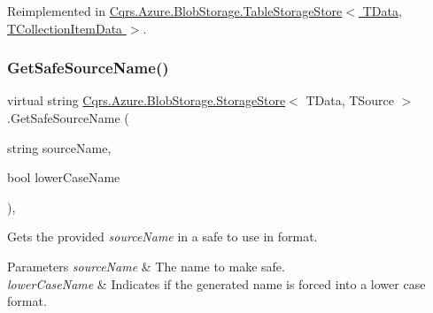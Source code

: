 Reimplemented in \hyperlink{classCqrs_1_1Azure_1_1BlobStorage_1_1TableStorageStore_a7b9e49aa8017ff3c55b184b956a150d0_a7b9e49aa8017ff3c55b184b956a150d0}{Cqrs.\+Azure.\+Blob\+Storage.\+Table\+Storage\+Store$<$ T\+Data, T\+Collection\+Item\+Data $>$}.

\mbox{\label{classCqrs_1_1Azure_1_1BlobStorage_1_1StorageStore_ad3364a0c84d5ed666615b9528d6f640e_ad3364a0c84d5ed666615b9528d6f640e}} 
\subsubsection{\texorpdfstring{Get\+Safe\+Source\+Name()}{GetSafeSourceName()}\hspace{0.1cm}{\footnotesize\ttfamily [2/2]}}
{\footnotesize\ttfamily virtual string \hyperlink{classCqrs_1_1Azure_1_1BlobStorage_1_1StorageStore}{Cqrs.\+Azure.\+Blob\+Storage.\+Storage\+Store}$<$ T\+Data, T\+Source $>$.Get\+Safe\+Source\+Name (\begin{DoxyParamCaption}\item[{string}]{source\+Name,  }\item[{bool}]{lower\+Case\+Name }\end{DoxyParamCaption})\hspace{0.3cm}{\ttfamily [protected]}, {\ttfamily [virtual]}}



Gets the provided {\itshape source\+Name}  in a safe to use in format. 


\begin{DoxyParams}{Parameters}
{\em source\+Name} & The name to make safe.\\
\hline
{\em lower\+Case\+Name} & Indicates if the generated name is forced into a lower case format.\\
\hline
\end{DoxyParams}
\mbox{\label{classCqrs_1_1Azure_1_1BlobStorage_1_1StorageStore_a9ded88f1b48cf61b3be826fb0997adfb_a9ded88f1b48cf61b3be826fb0997adfb}} 
